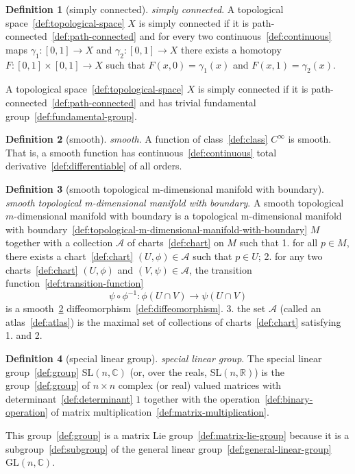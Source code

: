 \documentclass[12pt,a4paper]{article}
\theoremstyle{definition}
\newtheorem{definition}{Definition}
\begin{document}
\begin{definition}[simply connected]\label{def:simply-connected}
\emph{simply connected}. A topological space~\ref{def:topological-space} $X$ is simply connected if it is path-connected~\ref{def:path-connected} and for every two continuous~\ref{def:continuous} maps $\gamma_1:[0,1]\to X$ and $\gamma_2:[0,1]\to X$ there exists a homotopy $F:[0,1]\times[0,1]\to X$ such that $F(x,0)= \gamma_1(x)$ and $F(x,1) = \gamma_2(x)$.  

A topological space~\ref{def:topological-space} $X$ is simply connected if it is path-connected~\ref{def:path-connected} and has trivial fundamental group~\ref{def:fundamental-group}.
\end{definition}

\begin{definition}[smooth]\label{def:smooth}
\emph{smooth}. A function of class~\ref{def:class} $C^{\infty}$ is smooth. That is, a smooth function has continuous~\ref{def:continuous} total derivative~\ref{def:differentiable} of all orders.
\end{definition}

\begin{definition}[smooth topological m-dimensional manifold with boundary]\label{def:smooth-topological-m-dimensional-manifold-with-boundary}
\emph{smooth topological m-dimensional manifold with boundary}. A smooth topological $m$-dimensional manifold with boundary is a topological m-dimensional manifold with boundary~\ref{def:topological-m-dimensional-manifold-with-boundary} $M$ together with a collection $\mathcal A$ of charts~\ref{def:chart} on $M$ such that 
1. for all $p\in M$, there exists a chart~\ref{def:chart} $(U, \phi)\in \mathcal A$ such that $p \in U$;
2. for any two charts~\ref{def:chart} $(U,\phi)$ and $(V, \psi) \in \mathcal A$, the transition function~\ref{def:transition-function} $$\psi\circ \phi^{-1}:\phi(U\cap V)\to\psi(U\cap V)$$ is a smooth~\ref{def:smooth} diffeomorphism~\ref{def:diffeomorphism}.
3. the set $\mathcal A$ (called an atlas~\ref{def:atlas}) is the maximal set of collections of charts~\ref{def:chart} satisfying 1. and 2.
\end{definition}

\begin{definition}[special linear group]\label{def:special-linear-group}
\emph{special linear group}. The special linear group~\ref{def:group} $\text{SL}(n,\mathbb C)$ (or, over the reals, $\text{SL}(n,\mathbb R)$) is the group~\ref{def:group} of $n\times n$ complex (or real) valued matrices with determinant~\ref{def:determinant} $1$ together with the operation~\ref{def:binary-operation} of matrix multiplication~\ref{def:matrix-multiplication}.

This group~\ref{def:group} is a matrix Lie group~\ref{def:matrix-lie-group} because it is a subgroup~\ref{def:subgroup} of the general linear group~\ref{def:general-linear-group} $\text{GL}(n,\mathbb C)$.
\end{definition}
\end{document}
